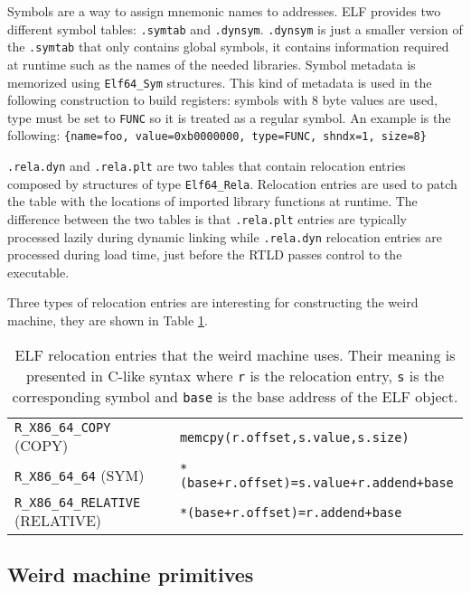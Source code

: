 \documentclass[11pt,twoside,a4paper]{article}
\begin{document}
Symbols are a way to assign mnemonic names to addresses. ELF provides two different symbol tables: \texttt{.symtab} and \texttt{.dynsym}. \texttt{.dynsym} is just a smaller version of the \texttt{.symtab} that only contains global symbols, it contains information required at runtime such as the names of the needed libraries. Symbol metadata is memorized using \texttt{Elf64\_Sym} structures. This kind of metadata is used in the following construction to build registers: symbols with 8 byte values are used, type must be set to \texttt{FUNC} so it is treated as a regular symbol. An example is the following:
\texttt{\{name=foo, value=0xb0000000, type=FUNC, shndx=1, size=8\}}

\texttt{.rela.dyn} and \texttt{.rela.plt} are two tables that contain relocation entries composed by structures of type \texttt{Elf64\_Rela}. Relocation entries are used to patch the table with the locations of imported library functions at runtime. The difference between the two tables is that \texttt{.rela.plt} entries are typically processed lazily during dynamic linking while \texttt{.rela.dyn} relocation entries are processed during load time, just before the RTLD passes control to the executable.

Three types of relocation entries are interesting for constructing the weird machine, they are shown in Table \ref{r_entries}.

\begin{table}
\begin{tabular}{ l | l }
  \hline
  \texttt{R\_X86\_64\_COPY} (COPY) & \texttt{memcpy(r.offset,s.value,s.size)} \\
  \texttt{R\_X86\_64\_64} (SYM) & \texttt{*(base+r.offset)=s.value+r.addend+base} \\
  \texttt{R\_X86\_64\_RELATIVE} (RELATIVE) & \texttt{*(base+r.offset)=r.addend+base} \\
  \hline
\end{tabular}
  \caption{ELF relocation entries that the weird machine uses. Their meaning is presented in C-like syntax where \texttt{r} is the relocation entry, \texttt{s} is the corresponding symbol and \texttt{base} is the base address of the ELF object.}
  \label{r_entries}
\end{table}


\subsection{Weird machine primitives}
\end{document}
